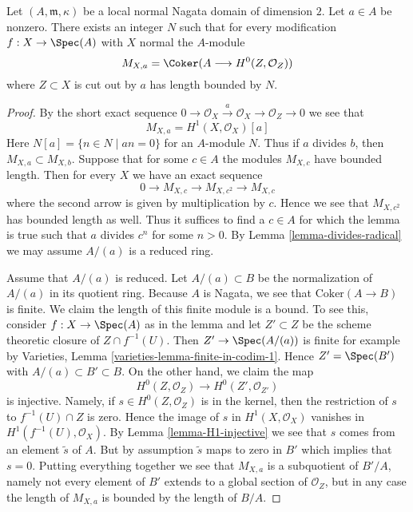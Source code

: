 \begin{lemma}
\label{lemma-bound-a-torsion}
Let $(A, \mathfrak m, \kappa)$ be a local normal Nagata domain
of dimension $2$. Let $a \in A$ be nonzero. There exists an integer $N$ such
that for every modification $f : X \to \Spec(A)$ with $X$ normal the
$A$-module
$$
M_{X, a} = \Coker(A \longrightarrow H^0(Z, \mathcal{O}_Z))
$$
where $Z \subset X$ is cut out by $a$ has length bounded by $N$.
\end{lemma}

\begin{proof}
By the short exact sequence
$
0 \to \mathcal{O}_X \xrightarrow{a} \mathcal{O}_X \to \mathcal{O}_Z \to 0
$
we see that
\begin{equation}
\label{equation-a-torsion}
M_{X, a} = H^1(X, \mathcal{O}_X)[a]
\end{equation}
Here $N[a] = \{n \in N \mid an = 0\}$ for an $A$-module $N$. Thus
if $a$ divides $b$, then $M_{X, a} \subset M_{X, b}$.
Suppose that for some $c \in A$ the modules $M_{X, c}$
have bounded length. Then for every $X$ we have an exact sequence
$$
0 \to M_{X, c} \to M_{X, c^2} \to M_{X, c}
$$
where the second arrow is given by multiplication by $c$. Hence we see that
$M_{X, c^2}$ has bounded length as well. Thus it suffices to find a $c \in A$
for which the lemma is true such that $a$ divides $c^n$ for some $n > 0$.
By Lemma \ref{lemma-divides-radical} we may assume $A/(a)$ is a reduced ring.

\medskip\noindent
Assume that $A/(a)$ is reduced. Let $A/(a) \subset B$ be the normalization
of $A/(a)$ in its quotient ring. Because $A$ is Nagata, we see that
$\text{Coker}(A \to B)$ is finite. We claim the length of this finite
module is a bound. To see this, consider $f : X \to \Spec(A)$ as in the lemma
and let $Z' \subset Z$ be the scheme theoretic closure of $Z \cap f^{-1}(U)$.
Then $Z' \to \Spec(A/(a))$ is finite for example by Varieties, Lemma
\ref{varieties-lemma-finite-in-codim-1}.
Hence $Z' = \Spec(B')$ with $A/(a) \subset B' \subset B$.
On the other hand, we claim the map
$$
H^0(Z, \mathcal{O}_Z) \to H^0(Z', \mathcal{O}_{Z'})
$$
is injective. Namely, if $s \in H^0(Z, \mathcal{O}_Z)$
is in the kernel, then
the restriction of $s$ to $f^{-1}(U) \cap Z$ is zero.
Hence the image of $s$ in $H^1(X, \mathcal{O}_X)$ vanishes in
$H^1(f^{-1}(U), \mathcal{O}_X)$. By Lemma \ref{lemma-H1-injective}
we see that $s$ comes from an element $\tilde s$ of $A$. But by
assumption $\tilde s$ maps to zero in $B'$ which implies that $s = 0$.
Putting everything together we see that
$M_{X, a}$ is a subquotient of $B'/A$, namely not every element
of $B'$ extends to a global section of $\mathcal{O}_Z$, but in
any case the length of $M_{X, a}$ is bounded by the length of $B/A$.
\end{proof}

